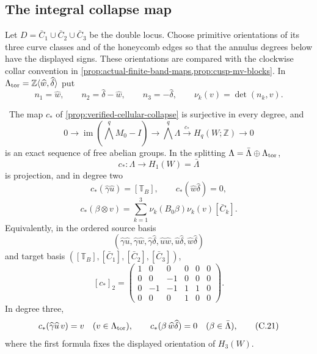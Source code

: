 \subsection{The integral collapse map}

Let $D=\bar C_1\cup\bar C_2\cup\bar C_3$ be the double locus.  Choose
primitive orientations of its three curve classes and of the honeycomb edges
so that the annulus degrees below have the displayed signs.  These orientations
are compared with the clockwise collar convention in
\cref{prop:actual-finite-band-maps,prop:cusp-mv-blocks}.  In
$\Lambda_{\rm tor}=\mathbb Z\langle\widehat w,\widehat\delta\rangle$ put
\[
 n_1=\widehat w,\qquad n_2=\widehat\delta-\widehat w,\qquad
 n_3=-\widehat\delta,\qquad
 \nu_k(v)=\det(n_k,v).
\tag{C.16}
\]

\begin{proposition}
\label{prop:verified-collapse-homology}
\Verified\ The map $c_*$ of \cref{prop:verified-cellular-collapse} is
surjective in every degree, and
\[
 0\longrightarrow\operatorname{im}(\textstyle\bigwedge^qM_0-I)
 \longrightarrow\textstyle\bigwedge^q\Lambda
 \xrightarrow{c_*}H_q(W;\mathbb Z)\longrightarrow0
\tag{C.17}
\]
is an exact sequence of free abelian groups.  In the splitting
$\Lambda=\bar\Lambda\oplus\Lambda_{\rm tor}$,
\[
 c_*:\Lambda\to H_1(W)=\bar\Lambda
\]
is projection, and in degree two
\[
 c_*(\widehat\gamma\widehat u)=[\mathbb T_B],\qquad
 c_*(\widehat w\widehat\delta)=0,
\tag{C.18}
\]
\[
 c_*(\beta\otimes v)=
 \sum_{k=1}^3\nu_k(B_0\beta)\nu_k(v)[\bar C_k].
\tag{C.19}
\]
Equivalently, in the ordered source basis
\[
(\widehat\gamma\widehat u,\widehat\gamma\widehat w,
 \widehat\gamma\widehat\delta,\widehat u\widehat w,
 \widehat u\widehat\delta,\widehat w\widehat\delta)
\]
and target basis
$([\mathbb T_B],[\bar C_1],[\bar C_2],[\bar C_3])$,
\[
[c_*]_2=
\begin{pmatrix}
1&0&0&0&0&0\\
0&0&-1&0&0&0\\
0&-1&-1&1&1&0\\
0&0&0&1&0&0
\end{pmatrix}.
\tag{C.20}
\]
In degree three,
\[
 c_*(\widehat\gamma\widehat u\,v)=v
 \quad(v\in\Lambda_{\rm tor}),
 \qquad
 c_*(\beta\,\widehat w\widehat\delta)=0
 \quad(\beta\in\bar\Lambda),
\tag{C.21}
\]
where the first formula fixes the displayed orientation of $H_3(W)$.
\end{proposition}

